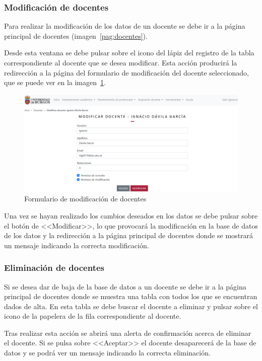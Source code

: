 \subsubsection{Modificación de docentes}
Para realizar la modificación de los datos de un docente se debe ir a la página principal de docentes (imagen~\ref{pag:docentes}).

Desde esta ventana se debe pulsar sobre el icono del lápiz del registro de la tabla correspondiente al docente que se desea modificar.
Esta acción producirá la redirección a la página del formulario de modificación del docente seleccionado, que se puede ver en la imagen~\ref{pag:formModDocente}.

\begin{figure}
	\centering
	\includegraphics[width=\textwidth]{../img/Anexos/Manual usuario/formModDocente.png}
	\caption{Formulario de modificación de docentes}\label{pag:formModDocente}
\end{figure}

Una vez se hayan realizado los cambios deseados en los datos se debe pulsar sobre el botón de <<Modificar>>, lo que provocará la modificación en la base de datos de los datos y la redirección a la página principal de docentes donde se mostrará un mensaje indicando la correcta modificación.

\subsubsection{Eliminación de docentes}
Si se desea dar de baja de la base de datos a un docente se debe ir a la página principal de docentes donde se muestra una tabla con todos los que se encuentran dados de alta.
En esta tabla se debe buscar el docente a eliminar y pulsar sobre el icono de la papelera de la fila correspondiente al docente.

Tras realizar esta acción se abrirá una alerta de confirmación acerca de eliminar el docente.
Si se pulsa sobre <<Aceptar>> el docente desaparecerá de la base de datos y se podrá ver un mensaje indicando la correcta eliminación.

